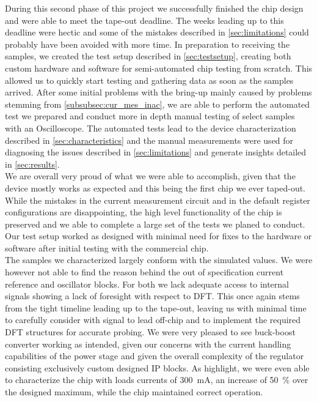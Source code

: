 During this second phase of this project we successfully finished the chip design and were able to meet the tape-out deadline. The weeks leading up to this deadline were hectic and some of the mistakes described in \autoref{sec:limitations} could probably have been avoided with more time. In preparation to receiving the samples, we created the test setup described in \autoref{sec:testsetup}, creating both custom hardware and software for semi-automated chip testing from scratch. This allowed us to quickly start testing and gathering data as soon as the samples arrived. After some initial problems with the bring-up mainly caused by problems stemming from \autoref{subsubsec:cur_mes_inac}, we are able to perform the automated test we prepared and conduct more in depth manual testing of select samples with an Oscilloscope. The automated tests lead to the device characterization described in \autoref{sec:characteristics} and the manual measurements were used for diagnosing the issues described in \autoref{sec:limitations} and generate insights detailed in \autoref{sec:results}. \\

We are overall very proud of what we were able to accomplish, given that the device mostly works as expected and this being the first chip we ever taped-out. While the mistakes in the current measurement circuit and in the default register configurations are disappointing, the high level functionality of the chip is preserved and we able to complete a large set of the tests we planed to conduct. Our test setup worked as designed with minimal need for fixes to the hardware or software after initial testing with the commercial chip. \\

The samples we characterized largely conform with the simulated values. We were however not able to find the reason behind the out of specification current reference and oscillator blocks. For both we lack adequate access to internal signals showing a lack of foresight with respect to \ac{DFT}. This once again stems from the tight timeline leading up to the tape-out, leaving us with minimal time to carefully consider with signal to lead off-chip and to implement the required \ac{DFT} structures for accurate probing. We were very pleased to see buck-boost converter working as intended, given our concerns with the current handling capabilities of the power stage and given the overall complexity of the regulator consisting exclusively custom designed IP blocks. As highlight, we were even able to characterize the chip with loads currents of \qty{300}{\milli\ampere}, an increase of \qty{50}{\percent} over the designed maximum, while the chip maintained correct operation. 






\clearpage